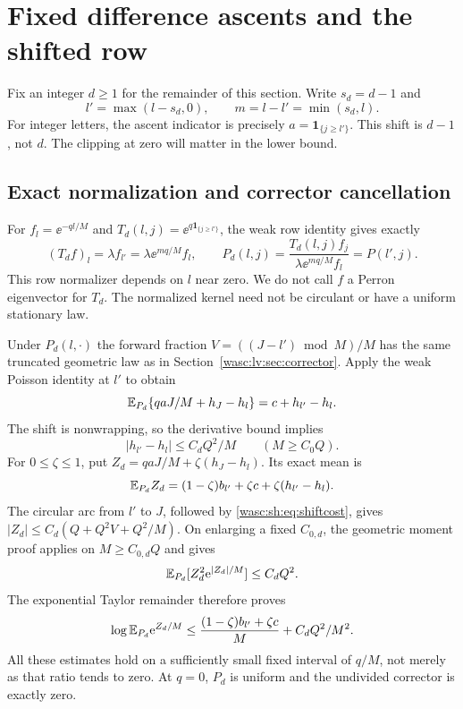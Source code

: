 \documentclass[11pt,a4paper]{article}
\theoremstyle{remark}\newtheorem{remark}[theorem]{Remark}
\newcommand{\ind}{\mathbf 1}\newcommand{\wasc}{\operatorname{wasc}}\newcommand{\dasc}{\operatorname{dasc}}
\numberwithin{equation}{section}
\begin{document}
\section{Fixed difference ascents and the shifted row}\label{wasc:sh:sec:difference}
Fix an integer $d\ge1$ for the remainder of this section. Write $s_d=d-1$ and
\[
l'=\max(l-s_d,0),\qquad m=l-l'=\min(s_d,l).
\]
For integer letters, the ascent indicator is precisely $a=\ind_{\{j\ge l'\}}$. This shift is $d-1$, not $d$. The clipping at zero will matter in the lower bound.

\subsection{Exact normalization and corrector cancellation}
For $f_l=\ee^{-ql/M}$ and $T_d(l,j)=\ee^{q\ind_{\{j\ge l'\}}}$, the weak row identity gives exactly
\begin{equation}\label{wasc:sh:eq:shiftrow}
(T_df)_l=\lambda f_{l'}=\lambda\ee^{mq/M}f_l,\qquad
P_d(l,j)=\frac{T_d(l,j)f_j}{\lambda\ee^{mq/M}f_l}=P(l',j).
\end{equation}
This row normalizer depends on $l$ near zero. We do not call $f$ a Perron eigenvector for $T_d$. The normalized kernel need not be circulant or have a uniform stationary law.

Under $P_d(l,\cdot)$ the forward fraction
$V=((J-l')\bmod M)/M$ has the same truncated geometric law as in Section~\ref{wasc:lv:sec:corrector}. Apply the weak Poisson identity at $l'$ to obtain
\begin{equation}\label{wasc:sh:eq:shiftcancel}
\mathbb E_{P_d}\{qaJ/M+h_J-h_l\}=c+h_{l'}-h_l.
\end{equation}
The shift is nonwrapping, so the derivative bound implies
\begin{equation}\label{wasc:sh:eq:shiftcost}
|h_{l'}-h_l|\le C_dQ^2/M\qquad(M\ge C_0Q).
\end{equation}
For $0\le\zeta\le1$, put $Z_d=qaJ/M+\zeta(h_J-h_l)$. Its exact mean is
\[
\mathbb E_{P_d}Z_d=(1-\zeta)b_{l'}+\zeta c+\zeta(h_{l'}-h_l).
\]
The circular arc from $l'$ to $J$, followed by \eqref{wasc:sh:eq:shiftcost}, gives
$|Z_d|\le C_d(Q+Q^2V+Q^2/M)$. On enlarging a fixed $C_{0,d}$, the geometric moment proof applies on $M\ge C_{0,d}Q$ and gives
\[
\mathbb E_{P_d}[Z_d^2\mathrm e^{|Z_d|/M}]\le C_dQ^2.
\]
The exponential Taylor remainder therefore proves
\begin{equation}\label{wasc:sh:eq:dexp}
\log\mathbb E_{P_d}\mathrm e^{Z_d/M}
\le\frac{(1-\zeta)b_{l'}+\zeta c}{M}+C_dQ^2/M^2.
\end{equation}
All these estimates hold on a sufficiently small fixed interval of $q/M$, not merely as that ratio tends to zero. At $q=0$, $P_d$ is uniform and the undivided corrector is exactly zero.
\end{document}
